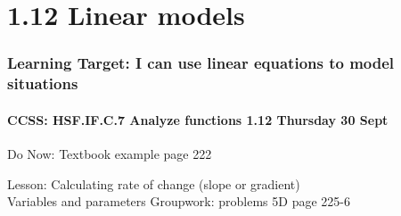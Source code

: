 \documentclass{beamer}
\begin{document}
  \section{1.12 Linear models}
  \frame
  {
    \frametitle{Learning Target: I can use linear equations to model situations}
    \framesubtitle{CCSS: HSF.IF.C.7 Analyze functions \hfill \alert{1.12 Thursday 30 Sept}}

    \begin{block}{Do Now: Textbook example page 222}
    \end{block}\vspace{0.5cm}
    Lesson: Calculating rate of change (slope or gradient)\\[0.25cm]
    Variables and parameters
    Groupwork: problems 5D page 225-6
  }
\end{document}
